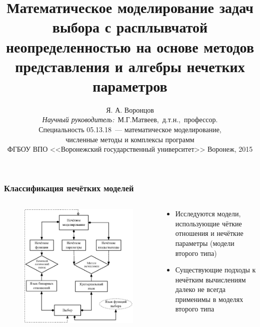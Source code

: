 \documentclass[12pt]{beamer}
\title{\Large{Математическое моделирование задач выбора с расплывчатой неопределенностью на основе методов представления и алгебры нечетких параметров}}
\author{\normalsize{%
Я. А. Воронцов\\%
\emph{Научный руководитель:}~М.Г.Матвеев,~д.т.н.,~профессор.}\\%
\small{
\vspace{2pt}
Специальность 05.13.18~--- математическое моделирование,\\ численные методы и комплексы программ \\
\vspace{2pt}
ФГБОУ ВПО <<Воронежский государственный университет>>%
\vspace{10pt}%
}
\small{Воронеж, 2015}
}
\begin{document}
\maketitle

\begin{frame}
  \frametitle{Классификация нечётких моделей}
  \begin{columns}[onlytextwidth]
    \begin{column}{0.6\textwidth}
      \begin{figure}[h]
        \includegraphics[width=\textwidth]{choice-classification}
      \end{figure}
    \end{column}
    \begin{column}{0.4\textwidth}
      \begin{itemize}
        \item Исследуются модели, использующие чёткие отношения и нечёткие параметры (модели второго типа)
        \item Существующие подходы к нечётким вычислениям далеко не всегда применимы в моделях второго типа
      \end{itemize}
    \end{column}
  \end{columns}
\end{frame}
\end{document}
